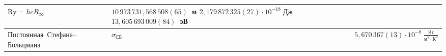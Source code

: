 \begin{labsupplement}
\begin{longtable}{p{46mm}>{\centering}p{14mm}p{45mm}}
                   $\mathrm{Ry} = hcR_{\infty}$
                 & $10\,973\,731,568\,508(65)$~м \newline
                   $2,179\,872\,325(27)\cdot 10^{-18}\;Дж$ \newline
                   $13,605\,693\,009(84)$~эВ                            \\ \hline
\mbox{Постоянная Стефана--Больцмана}
                 & $\sigma_{СБ}$
                 & $5,670\,367(13)\cdot 10^{-8}\;\frac{Вт}{м^2\cdot К^4}$       \\
\bottomrule[1pt]
\end{longtable}


\end{labsupplement}

